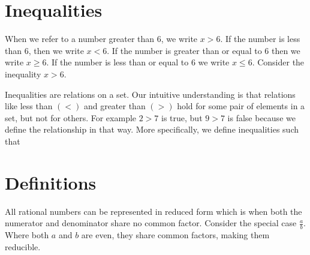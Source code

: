 \documentclass[12pt]{report}
\begin{document}
\section{Inequalities}

\hspace{\parindent}When we refer to a number greater than $6$, we write $x > 6$. If the number is less than 6, then we write $x < 6$. If the number is greater than or equal to 6 then we write $x \geq 6$. If the number is less than or equal to $6$ we write $x \leq 6$. Consider the inequality $x > 6$.

Inequalities are relations on a set. Our intuitive understanding is that relations like less than $(<)$ and greater than $(>)$ hold for some pair of elements in a set, but not for others. For example $2>7$ is true, but $9>7$ is false because we define the relationship in that way. More specifically, we define inequalities such that\bigskip



\section{Definitions}

\bigskip

All rational numbers can be represented in reduced form which is when both the numerator and denominator share no common factor. Consider the special case $\frac{a}{b}$. Where both $a$ and $b$ are even, they share common factors, making them reducible.\bigskip
{}\bigskip
\end{document}
